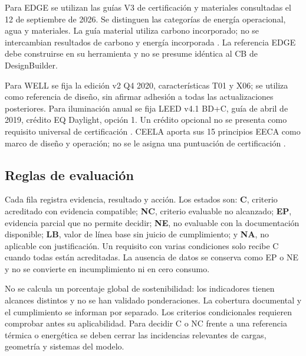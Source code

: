 Para EDGE se utilizan las guías V3 de certificación y materiales consultadas el 12 de septiembre de 2026. Se distinguen las categorías de energía operacional, agua y materiales. La guía material utiliza carbono incorporado; no se intercambian resultados de carbono y energía incorporada \parencite{ifcEdgeCertificacion2026,ifcEdgeMateriales2025}. La referencia EDGE debe construirse en su herramienta y no se presume idéntica al CB de DesignBuilder.

Para WELL se fija la edición v2 Q4 2020, características T01 y X06; se utiliza como referencia de diseño, sin afirmar adhesión a todas las actualizaciones posteriores. Para iluminación anual se fija LEED v4.1 BD+C, guía de abril de 2019, crédito EQ Daylight, opción 1. Un crédito opcional no se presenta como requisito universal de certificación \parencite{iwbiWellV22020,usgbcLeedV41Guide2019}. CEELA aporta sus 15 principios EECA como marco de diseño y operación; no se le asigna una puntuación de certificación \parencite{ceelaPrincipiosEECA2024}.

\subsection{Reglas de evaluación}
Cada fila registra evidencia, resultado y acción. Los estados son: \textbf{C}, criterio acreditado con evidencia compatible; \textbf{NC}, criterio evaluable no alcanzado; \textbf{EP}, evidencia parcial que no permite decidir; \textbf{NE}, no evaluable con la documentación disponible; \textbf{LB}, valor de línea base sin juicio de cumplimiento; y \textbf{NA}, no aplicable con justificación. Un requisito con varias condiciones solo recibe C cuando todas están acreditadas. La ausencia de datos se conserva como EP o NE y no se convierte en incumplimiento ni en cero consumo.

No se calcula un porcentaje global de sostenibilidad: los indicadores tienen alcances distintos y no se han validado ponderaciones. La cobertura documental y el cumplimiento se informan por separado. Los criterios condicionales requieren comprobar antes su aplicabilidad. Para decidir C o NC frente a una referencia térmica o energética se deben cerrar las incidencias relevantes de cargas, geometría y sistemas del modelo.

\par\medskip
